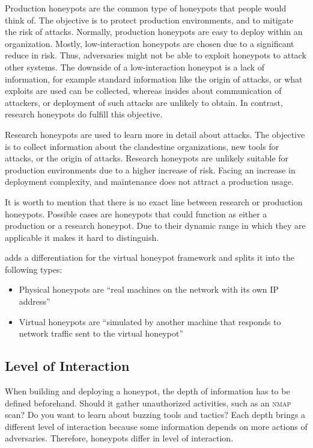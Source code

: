Production honeypots are the common type of honeypots that people would think of.
The objective is to protect production environments, and to mitigate the risk of attacks.
Normally, production honeypots are easy to deploy within an organization.
Mostly, low-interaction honeypots are chosen due to a significant reduce in risk.
Thus, adversaries might not be able to exploit honeypots to attack other systems.
The downside of a low-interaction honeypot is a lack of information, for example standard information like the origin of attacks, or what exploits are used can be collected, whereas insides about communication of attackers, or deployment of such attacks are unlikely to obtain.
In contrast, research honeypots do fulfill this objective.\cite{Spitzner2003}

Research honeypots are used to learn more in detail about attacks.
The objective is to collect information about the clandestine organizations, new tools for attacks, or the origin of attacks.
Research honeypots are unlikely suitable for production environments due to a higher increase of risk.
Facing an increase in deployment complexity, and maintenance does not attract a production usage.\cite{Spitzner2003}

It is worth to mention that there is no exact line between research or production honeypots.
Possible cases are honeypots that could function as either a production or a research honeypot.
Due to their dynamic range in which they are applicable it makes it hard to distinguish.

\citet{Provos2003} adds a differentiation for the virtual honeypot framework and splits it into the following types:

\begin{itemize}
    \item Physical honeypots are \enquote{real machines on the network with its own IP address} \cite{Provos2003}
    \item Virtual honeypots are \enquote{simulated by another machine that responds to network traffic sent to the virtual honeypot} \cite{Provos2003}
\end{itemize}

\subsection{Level of Interaction}
\label{subsec:interaction-honeypots}

When building and deploying a honeypot, the depth of information has to be defined beforehand.
Should it gather unauthorized activities, such as an \textsc{nmap} scan?
Do you want to learn about buzzing tools and tactics?
Each depth brings a different level of interaction because some information depends on more actions of adversaries.
Therefore, honeypots differ in level of interaction.

